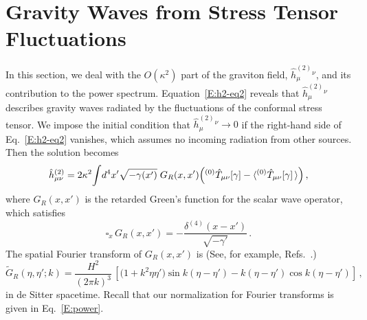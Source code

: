 \documentclass[preprint,prd,showpacs,superscriptaddress]{revtex4}
\begin{document}
\section{Gravity Waves from Stress Tensor Fluctuations}
\label{S:P22}

In this section, we deal with the $O(\kappa^2)$ part of the graviton field, $\hat{h }^{(2)}_{\mu}{}^{\nu}$, 
 and its contribution to the  power spectrum. Equation~\eqref{E:h2-eq2} reveals that 
$\hat{h }^{(2)}_{\mu}{}^{\nu}$ describes gravity waves radiated by the fluctuations of the conformal
stress tensor. We impose the initial condition that $\hat{h }^{(2)}_{\mu}{}^{\nu}\rightarrow 0$ if
the right-hand side of Eq.~\eqref{E:h2-eq2} vanishes, which assumes no incoming radiation from
other sources. Then the solution becomes
 \begin{equation}\label{E:h2soln}
	\hat{h}^{(2)}_{\mu\nu}=2\kappa^{2}\!\int\!d^{4}x'\sqrt{-\gamma(x')}\;G_{R}(x,x')\Bigl({}^{(0)}\hat{T}_{\mu\nu}[\gamma]
	-\langle{}^{(0)}\hat{T}_{\mu\nu}[\gamma]\,\rangle\Bigr)\,,
\end{equation}
where $G_{R}(x,x')$ is the retarded Green's function for the scalar wave operator, which satisfies
\begin{equation}\label{E:GR}
	\square_{x}\,G_{R}(x,x')=-\frac{\delta^{(4)}(x-x')}{\sqrt{-\gamma'}}\,.
\end{equation}
The spatial Fourier transform of $G_{R}(x,x')$  is (See, for example, Refs.~\cite{WKF07,WHFN11}.) 
\begin{equation}\label{E:Gk}
	\widetilde{G}_{R}(\eta,\eta'; {k})=\frac{H^{2}}{(2\pi k)^{3}}\,
	\left[\bigl(1+k^{2}\eta\eta'\bigr)\sin k(\eta-\eta')-k(\eta-\eta')\cos k(\eta-\eta')\right]\,,
\end{equation}
in de Sitter spacetime. Recall that our normalization for Fourier transforms is given in Eq.~\eqref{E:power}.
\end{document}
